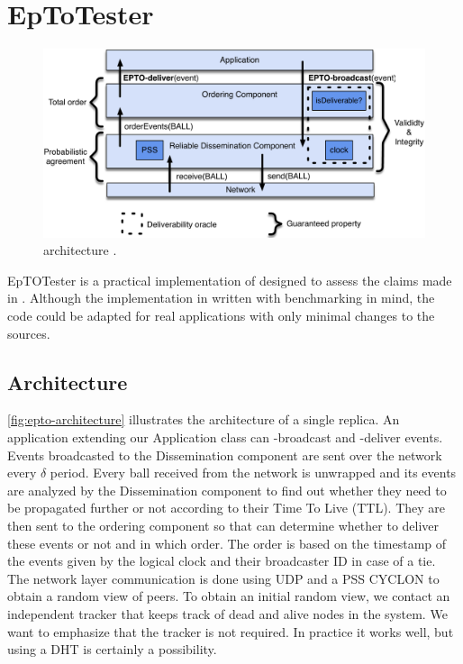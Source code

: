 \section{EpToTester}
\label{sec:epto}
\begin{figure}[htp]
	\includegraphics[width=\linewidth]{figures/architecture.pdf}
	\caption{\epto architecture \autocite{matos2015epto}.}
	\label{fig:epto-architecture}
\end{figure}
EpTOTester is a practical implementation of \epto designed to assess the claims made in \autocite{matos2015epto}. Although the implementation in written with benchmarking in mind, the code could be adapted for real applications with only minimal changes to the sources. 
\subsection{Architecture}
\autoref{fig:epto-architecture} illustrates the architecture of a single replica. An application extending our Application class can \epto-broadcast and \epto-deliver events. Events broadcasted to the Dissemination component are sent over the network every $\delta$ period. Every ball received from the network is unwrapped and its events are analyzed by the Dissemination component to find out whether they need to be propagated further or not according to their Time To Live (TTL). They are then sent to the ordering component so that \epto can determine whether to deliver these events or not and in which order. The order is based on the timestamp of the events given by the logical clock and their broadcaster ID in case of a tie. The network layer communication is done using UDP and a PSS CYCLON to obtain a random view of peers. To obtain an initial random view, we contact an independent tracker that keeps track of dead and alive nodes in the system. We want to emphasize that the tracker is not required. In practice it works well, but using a DHT is certainly a possibility.
